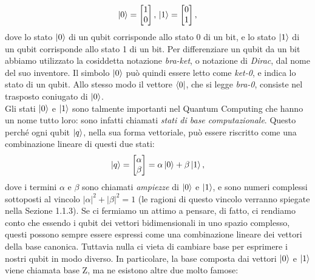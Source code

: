 \documentclass{book}
\theoremstyle{definition}
\theoremstyle{definition}
\theoremstyle{definition}
\theoremstyle{plain}
\theoremstyle{plain}
\theoremstyle{plain}
\theoremstyle{plain}
\begin{document}
\begin{displaymath}
\ket{0} = 
\begin{bmatrix}
1\\
0
\end{bmatrix}
, \,
 \ket{1} = 
\begin{bmatrix}
0\\
1
\end{bmatrix}
,
\end{displaymath}
dove lo stato $\ket{0}$ di un qubit corrisponde allo stato 0 di un bit, e lo stato $\ket{1}$ di un qubit corrisponde allo stato 1 di un bit. Per differenziare un qubit da un bit abbiamo utilizzato la cosiddetta notazione \emph{bra-ket}, o notazione di \emph{Dirac}, dal nome del suo inventore. Il simbolo $\ket{0}$ può quindi essere letto come \emph{ket-0}, e indica lo stato di un qubit. Allo stesso modo il vettore $\bra{0}$, che si legge \emph{bra-0}, consiste nel trasposto coniugato di $\ket{0}$.\\
Gli stati $\ket{0}$ e $\ket{1}$ sono talmente importanti nel Quantum Computing che hanno un nome tutto loro: sono infatti chiamati \emph{stati di base computazionale}. Questo perché ogni qubit $\ket{q}$, nella sua forma vettoriale, può essere riscritto come una combinazione lineare di questi due stati:
\begin{displaymath}
\ket{q} = 
\begin{bmatrix}
\alpha\\
\beta
\end{bmatrix}
= \alpha \ket{0} + \beta \ket{1} ,
\end{displaymath}
dove i termini $\alpha$ e $\beta$ sono chiamati \emph{ampiezze} di $\ket{0}$ e $\ket{1}$, e sono numeri complessi sottoposti al vincolo $\left\lvert \alpha \right\rvert^{2} + \left\lvert \beta \right\rvert^{2} = 1$ (le ragioni di questo vincolo verranno spiegate nella Sezione 1.1.3).
Se ci fermiamo un attimo a pensare, di fatto, ci rendiamo conto che essendo i qubit dei vettori bidimensionali in uno spazio complesso, questi possono sempre essere espressi come una combinazione lineare dei vettori della base canonica. Tuttavia nulla ci vieta di cambiare base per esprimere i nostri qubit in modo diverso. In particolare, la base composta dai vettori $\ket{0}$ e $\ket{1}$ viene chiamata base Z, ma ne esistono altre due molto famose:
\end{document}
